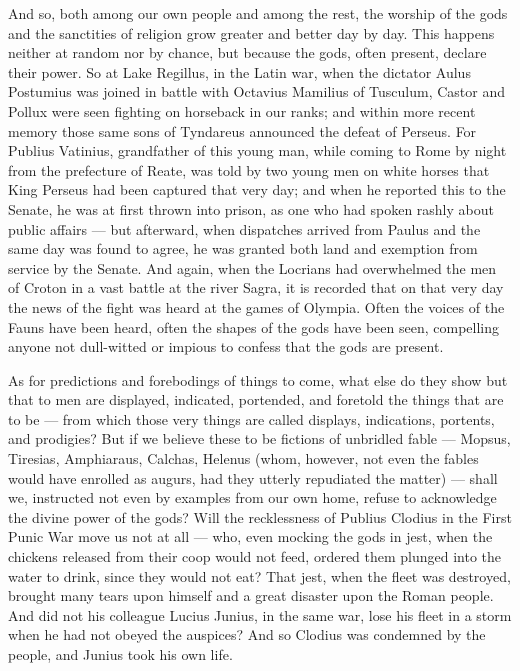  And so, both among our own people and among the rest, the worship of the gods and the sanctities of religion grow greater and better day by day. This happens neither at random nor by chance, but because the gods, often present, declare their power. So at Lake Regillus, in the Latin war, when the dictator Aulus Postumius was joined in battle with Octavius Mamilius of Tusculum, Castor and Pollux were seen fighting on horseback in our ranks; and within more recent memory those same sons of Tyndareus announced the defeat of Perseus. For Publius Vatinius, grandfather of this young man, while coming to Rome by night from the prefecture of Reate, was told by two young men on white horses that King Perseus had been captured that very day; and when he reported this to the Senate, he was at first thrown into prison, as one who had spoken rashly about public affairs — but afterward, when dispatches arrived from Paulus and the same day was found to agree, he was granted both land and exemption from service by the Senate. And again, when the Locrians had overwhelmed the men of Croton in a vast battle at the river Sagra, it is recorded that on that very day the news of the fight was heard at the games of Olympia. Often the voices of the Fauns have been heard, often the shapes of the gods have been seen, compelling anyone not dull-witted or impious to confess that the gods are present.

 As for predictions and forebodings of things to come, what else do they show but that to men are displayed, indicated, portended, and foretold the things that are to be — from which those very things are called displays, indications, portents, and prodigies? But if we believe these to be fictions of unbridled fable — Mopsus, Tiresias, Amphiaraus, Calchas, Helenus (whom, however, not even the fables would have enrolled as augurs, had they utterly repudiated the matter) — shall we, instructed not even by examples from our own home, refuse to acknowledge the divine power of the gods? Will the recklessness of Publius Clodius in the First Punic War move us not at all — who, even mocking the gods in jest, when the chickens released from their coop would not feed, ordered them plunged into the water to drink, since they would not eat? That jest, when the fleet was destroyed, brought many tears upon himself and a great disaster upon the Roman people. And did not his colleague Lucius Junius, in the same war, lose his fleet in a storm when he had not obeyed the auspices? And so Clodius was condemned by the people, and Junius took his own life.

